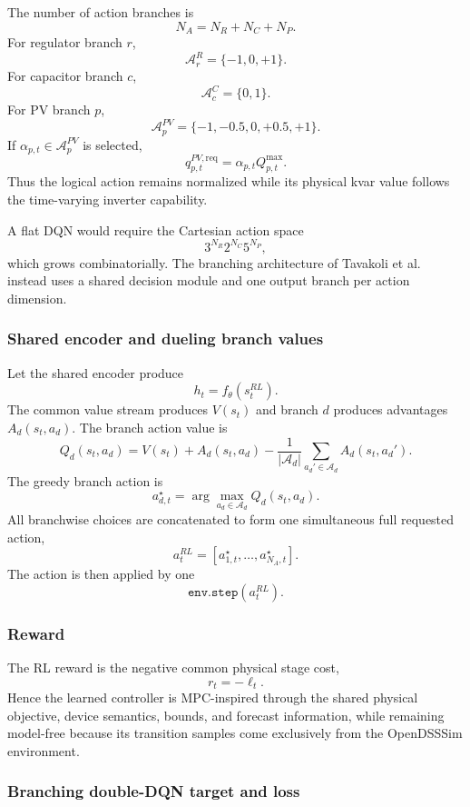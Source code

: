 The number of action branches is
\[
N_A
=
N_R+N_C+N_P.
\]
For regulator branch $r$,
\[
\mathcal A_r^R
=
\{-1,0,+1\}.
\]
For capacitor branch $c$,
\[
\mathcal A_c^C
=
\{0,1\}.
\]
For PV branch $p$,
\[
\boxed{
\mathcal A_p^{PV}
=
\{-1,-0.5,0,+0.5,+1\}.
}
\]
If $\alpha_{p,t}\in\mathcal A_p^{PV}$ is selected,
\[
\boxed{
q_{p,t}^{PV,\mathrm{req}}
=
\alpha_{p,t}Q_{p,t}^{\max}.
}
\]
Thus the logical action remains normalized while its physical kvar value follows the
time-varying inverter capability.

A flat DQN would require the Cartesian action space
\[
3^{N_R}2^{N_C}5^{N_P},
\]
which grows combinatorially.  The branching architecture of
Tavakoli et al.~\cite{tavakoli2018branching} instead uses a shared decision module and
one output branch per action dimension.

\subsubsection{Shared encoder and dueling branch values}

Let the shared encoder produce
\[
h_t
=
f_\theta(s_t^{RL}).
\]
The common value stream produces $V(s_t)$ and branch $d$ produces advantages
$A_d(s_t,a_d)$.  The branch action value is
\[
\boxed{
Q_d(s_t,a_d)
=
V(s_t)
+
A_d(s_t,a_d)
-
\frac{1}{|\mathcal A_d|}
\sum_{a_d'\in\mathcal A_d}
A_d(s_t,a_d').
}
\]
The greedy branch action is
\[
a_{d,t}^{\star}
=
\arg\max_{a_d\in\mathcal A_d}
Q_d(s_t,a_d).
\]
All branchwise choices are concatenated to form one simultaneous full requested action,
\[
a_t^{RL}
=
[
a_{1,t}^{\star},
\ldots,
a_{N_A,t}^{\star}
].
\]
The action is then applied by one
\[
\texttt{env.step}(a_t^{RL}).
\]

\subsubsection{Reward}

The RL reward is the negative common physical stage cost,
\[
\boxed{
r_t=-\ell_t.
}
\]
Hence the learned controller is MPC-inspired through the shared physical objective,
device semantics, bounds, and forecast information, while remaining model-free because
its transition samples come exclusively from the OpenDSSSim environment.

\subsubsection{Branching double-DQN target and loss}

